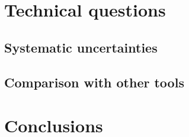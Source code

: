 \section{Technical questions}
\label{sec:information_extensions}

\subsection{Systematic uncertainties}

\subsection{Comparison with other tools}



\section{Conclusions}
\label{sec:information_conclusions}
